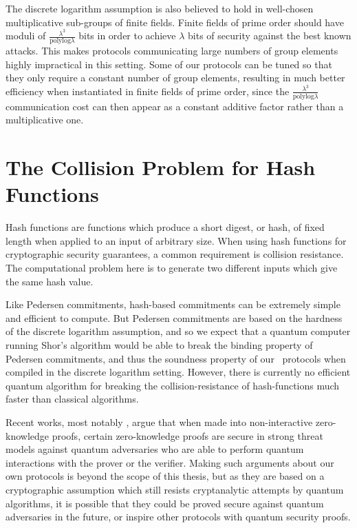 The discrete logarithm assumption is also believed to hold in well-chosen multiplicative sub-groups of finite fields. Finite fields of prime order should have moduli of $\frac{\lambda^3}{\mathrm{polylog}\lambda}$ bits in order to achieve $\lambda$ bits of security against the best known attacks. This makes protocols communicating large numbers of group elements highly impractical in this setting. Some of our protocols can be tuned so that they only require a constant number of group elements, resulting in much better efficiency when instantiated in finite fields of prime order, since the $\frac{\lambda^3}{\mathrm{polylog}\lambda}$ communication cost can then appear as a constant additive factor rather than a multiplicative one.

\section{The Collision Problem for Hash Functions}

Hash functions are functions which produce a short digest, or hash, of fixed length when applied to an input of arbitrary size. When using hash functions for cryptographic security guarantees, a common requirement is collision resistance. The computational problem here is to generate two different inputs which give the same hash value.

Like Pedersen commitments, hash-based commitments can be extremely simple and efficient to compute. But Pedersen commitments are based on the hardness of the discrete logarithm assumption, and so we expect that a quantum computer running Shor's algorithm would be able to break the binding property of Pedersen commitments, and thus the soundness property of our \ILC\ protocols when compiled in the discrete logarithm setting. However, there is currently no efficient quantum algorithm for breaking the collision-resistance of hash-functions much faster than classical algorithms.

Recent works, most notably \cite{Unruh17}, argue that when made into non-interactive zero-knowledge proofs, certain zero-knowledge proofs are secure in strong threat models against quantum adversaries who are able to perform quantum interactions with the prover or the verifier. Making such arguments about our own protocols is beyond the scope of this thesis, but as they are based on a cryptographic assumption which still resists cryptanalytic attempts by quantum algorithms, it is possible that they could be proved secure against quantum adversaries in the future, or inspire other protocols with quantum security proofs.

